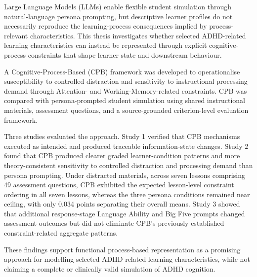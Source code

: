 Large Language Models (LLMs) enable flexible student simulation through natural-language persona prompting, but descriptive learner profiles do not necessarily reproduce the learning-process consequences implied by process-relevant characteristics. This thesis investigates whether selected ADHD-related learning characteristics can instead be represented through explicit cognitive-process constraints that shape learner state and downstream behaviour.

A Cognitive-Process-Based (CPB) framework was developed to operationalise susceptibility to controlled distraction and sensitivity to instructional processing demand through Attention- and Working-Memory-related constraints. CPB was compared with persona-prompted student simulation using shared instructional materials, assessment questions, and a source-grounded criterion-level evaluation framework.

Three studies evaluated the approach. Study 1 verified that CPB mechanisms executed as intended and produced traceable information-state changes. Study 2 found that CPB produced clearer graded learner-condition patterns and more theory-consistent sensitivity to controlled distraction and processing demand than persona prompting. Under distracted materials, across seven lessons comprising 49 assessment questions, CPB exhibited the expected lesson-level constraint ordering in all seven lessons, whereas the three persona conditions remained near ceiling, with only 0.034 points separating their overall means. Study 3 showed that additional response-stage Language Ability and Big Five prompts changed assessment outcomes but did not eliminate CPB's previously established constraint-related aggregate patterns.

These findings support functional process-based representation as a promising approach for modelling selected ADHD-related learning characteristics, while not claiming a complete or clinically valid simulation of ADHD cognition.
